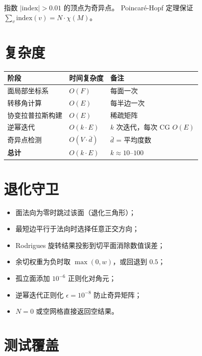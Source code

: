 \documentclass[11pt,a4paper]{article}
\begin{document}
指数 $|\text{index}| > 0.01$ 的顶点为奇异点。
Poincaré-Hopf 定理保证 $\sum_v \text{index}(v) = N \cdot \chi(M)$。

\section{复杂度}

\begin{center}
\renewcommand{\arraystretch}{1.18}
\begin{tabular}{@{}lll@{}}
  \toprule
  \textbf{阶段} & \textbf{时间复杂度} & \textbf{备注} \\
  \midrule
  面局部坐标系   & $O(F)$            & 每面一次 \\
  转移角计算     & $O(E)$            & 每半边一次 \\
  协变拉普拉斯构建 & $O(E)$          & 稀疏矩阵 \\
  逆幂迭代       & $O(k \cdot E)$    & $k$ 次迭代，每次 CG $O(E)$ \\
  奇异点检测     & $O(V \cdot \bar{d})$ & $\bar{d}$ = 平均度数 \\
  \midrule
  \textbf{总计}  & $O(k \cdot E)$    & $k \approx 10$--$100$ \\
  \bottomrule
\end{tabular}
\end{center}

\section{退化守卫}

\begin{itemize}
  \item 面法向为零时跳过该面（退化三角形）；
  \item 最短边平行于法向时选择任意正交方向；
  \item Rodrigues 旋转结果投影到切平面消除数值误差；
  \item 余切权重为负时取 $\max(0, w)$，或回退到 $0.5$；
  \item 孤立面添加 $10^{-6}$ 正则化对角元；
  \item 逆幂迭代正则化 $\epsilon = 10^{-8}$ 防止奇异矩阵；
  \item $N = 0$ 或空网格直接返回空结果。
\end{itemize}

\section{测试覆盖}
\end{document}
